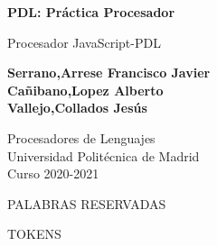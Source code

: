 \documentclass{article}
\begin{document}
\begin{titlepage}
    \begin{center}
        \vspace*{1cm}

        \Huge
        \textbf{PDL: Práctica Procesador}
        
        \vspace{0.5cm}
        \large
        Procesador JavaScript-PDL
        
        \vspace{3cm}
       
        \textbf{
            Serrano,Arrese Francisco Javier\\
            Cañibano,Lopez Alberto\\
            Vallejo,Collados Jesús
            }
            
        \vspace{8cm}
    
        \large
        Procesadores de Lenguajes\\
        Universidad Politécnica de Madrid\\
        Curso 2020-2021
        
    \end{center}
\end{titlepage}
\newpage
\begin{center}
    PALABRAS RESERVADAS
\end{center}
\begin{center}
    TOKENS
\end{center}
\end{document}
